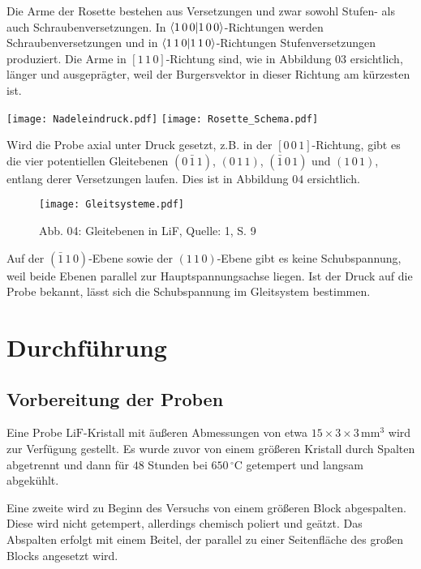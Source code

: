 \documentclass[12pt,a4paper]{scrartcl}
\numberwithin{equation}{section} %
\renewcommand{\[}{} %
\renewcommand{\]}{\noindent} %
\begin{document}
Die Arme der Rosette bestehen aus Versetzungen und zwar sowohl Stufen-
als auch Schraubenversetzungen. In \(\braket{1\,0\,0}\)-Richtungen
werden Schraubenversetzungen und in \(\braket{1\,1\,0}\)-Richtungen
Stufenversetzungen produziert. Die Arme in \([1\,1\,0]\)-Richtung sind,
wie in Abbildung \(03\) ersichtlich, länger und ausgeprägter, weil der
Burgersvektor in dieser Richtung am kürzesten ist.

\texttt{[image: Nadeleindruck.pdf]} \texttt{[image: Rosette\_Schema.pdf]}

Wird die Probe axial unter Druck gesetzt, z.B. in der
\([0\,0\,1]\)-Richtung, gibt es die vier potentiellen Gleitebenen
\((0\,\bar{1}\,1)\), \((0\,1\,1)\), \((\bar{1}\,0\,1)\) und
\((1\,0\,1)\), entlang derer Versetzungen laufen. Dies ist in Abbildung
\(04\) ersichtlich.

\begin{figure}
\centering
\texttt{[image: Gleitsysteme.pdf]}
\caption{Abb. 04: Gleitebenen in LiF, Quelle: 1, S. 9}
\end{figure}

Auf der \((\bar{1}\,1\,0)\)-Ebene sowie der \((1\,1\,0)\)-Ebene gibt es
keine Schubspannung, weil beide Ebenen parallel zur Hauptspannungsachse
liegen. Ist der Druck auf die Probe bekannt, lässt sich die
Schubspannung im Gleitsystem bestimmen.

\hypertarget{durchfuxfchrung}{%
\section{Durchführung}\label{durchfuxfchrung}}

\hypertarget{vorbereitung-der-proben}{%
\subsection{Vorbereitung der Proben}\label{vorbereitung-der-proben}}

Eine Probe \(\mathrm{LiF}\)-Kristall mit äußeren Abmessungen von etwa
\(15 \times 3 \times 3 \,\mathrm{mm^3}\) wird zur Verfügung gestellt. Es
wurde zuvor von einem größeren Kristall durch Spalten abgetrennt und
dann für \(48\) Stunden bei \(650\,^\circ\mathrm C\) getempert und
langsam abgekühlt.

Eine zweite wird zu Beginn des Versuchs von einem größeren Block
abgespalten. Diese wird nicht getempert, allerdings chemisch poliert und
geätzt. Das Abspalten erfolgt mit einem Beitel, der parallel zu einer
Seitenfläche des großen Blocks angesetzt wird.
\end{document}
